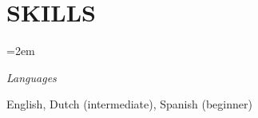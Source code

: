 \documentclass[paper=a4,fontsize=11pt]{scrartcl} %
\newlength{\spacebox}
\newcommand{\sepspace}{\vspace*{1em}}     %
\newcommand{\NewPart}[1]{\section*{\uppercase{#1}}}
\newcommand{\PersonalEntry}[2]{
    \noindent\hangindent=2em\hangafter=0  %
    \parbox{\spacebox}{                   %
    \textit{#1}}                          %
    \hspace{1.5em} #2 \par}               %
\newcommand{\SkillsEntry}[2]{             %
    \noindent\hangindent=2em\hangafter=0  %
    \parbox{\spacebox}{                   %
    \textit{#1}}                          %
    \hspace{1.5em} #2 \par}               %
\begin{document}
\NewPart{Skills}{}

\SkillsEntry{Languages}{English, Dutch (intermediate), Spanish (beginner)}

\end{document}
